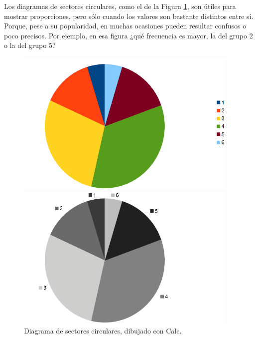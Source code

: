 Los diagramas de  {\sf sectores circulares}, como el de la Figura \ref{cap01:fig:DiagramaSectores},
  son útiles para  mostrar proporciones, pero sólo cuando los valores son bastante distintos entre sí. Porque, pese a su popularidad, en  muchas
  ocasiones pueden resultar confusos o poco precisos. Por ejemplo, en esa figura ¿qué frecuencia es mayor, la del grupo 2 o la del grupo 5?
    \begin{figure}[h]
	\centering
	\begin{enColor}
	\includegraphics[height=7cm]{../fig/Cap01-DiagramaSectoresconCalc.png}
	\end{enColor}
	\begin{bn}
	\includegraphics[height=7cm]{../fig/Cap01-DiagramaSectoresconCalc-bn.png}
	\end{bn}
	\caption{Diagrama de sectores circulares, dibujado con Calc.}
	\label{cap01:fig:DiagramaSectores}
    \end{figure}

